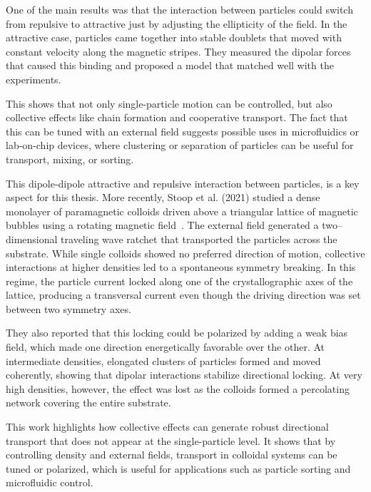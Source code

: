 One of the main results was that the interaction between particles could switch from repulsive to attractive just by adjusting the ellipticity of the field. In the attractive case, particles came together into stable doublets that moved with constant velocity along the magnetic stripes. They measured the dipolar forces that caused this binding and proposed a model that matched well with the experiments.

This shows that not only single-particle motion can be controlled, but also collective effects like chain formation and cooperative transport. The fact that this can be tuned with an external field suggests possible uses in microfluidics or lab-on-chip devices, where clustering or separation of particles can be useful for transport, mixing, or sorting.

This dipole-dipole attractive and repulsive interaction between particles, is a key aspect for this thesis. More recently, Stoop et al. (2021) studied a dense monolayer of paramagnetic colloids driven above a triangular lattice of magnetic bubbles using a rotating magnetic field~\cite{stoop2020collective}. The external field generated a two–dimensional traveling wave ratchet that transported the particles across the substrate. While single colloids showed no preferred direction of motion, collective interactions at higher densities led to a spontaneous symmetry breaking. In this regime, the particle current locked along one of the crystallographic axes of the lattice, producing a transversal current even though the driving direction was set between two symmetry axes.

They also reported that this locking could be polarized by adding a weak bias field, which made one direction energetically favorable over the other. At intermediate densities, elongated clusters of particles formed and moved coherently, showing that dipolar interactions stabilize directional locking. At very high densities, however, the effect was lost as the colloids formed a percolating network covering the entire substrate.

This work highlights how collective effects can generate robust directional transport that does not appear at the single-particle level. It shows that by controlling density and external fields, transport in colloidal systems can be tuned or polarized, which is useful for applications such as particle sorting and microfluidic control. 

